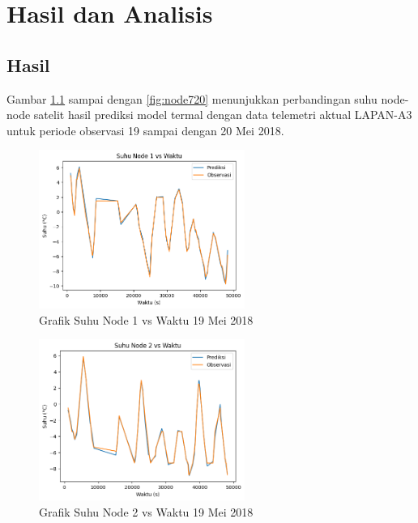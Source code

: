 \chapter{Hasil dan Analisis}

\section{Hasil}

Gambar \ref{fig:node119} sampai dengan \ref{fig:node720} menunjukkan perbandingan suhu node-node satelit
hasil prediksi model termal dengan data telemetri aktual LAPAN-A3 untuk periode observasi 19 sampai dengan 20 Mei 2018.

\begin{figure}[H]
\setlength{}
\begin{center}
\includegraphics[width=0.6\textwidth]{fig/node1_temp_2018-05-19.png}
\caption{Grafik Suhu Node 1 vs Waktu 19 Mei 2018}
\label{fig:node119}
\end{center}
\end{figure}

\begin{figure}[H]
\setlength{}
\begin{center}
\includegraphics[width=0.6\textwidth]{fig/node2_temp_2018-05-19.png}
\caption{Grafik Suhu Node 2 vs Waktu 19 Mei 2018}
\label{fig:node219}
\end{center}
\end{figure}

